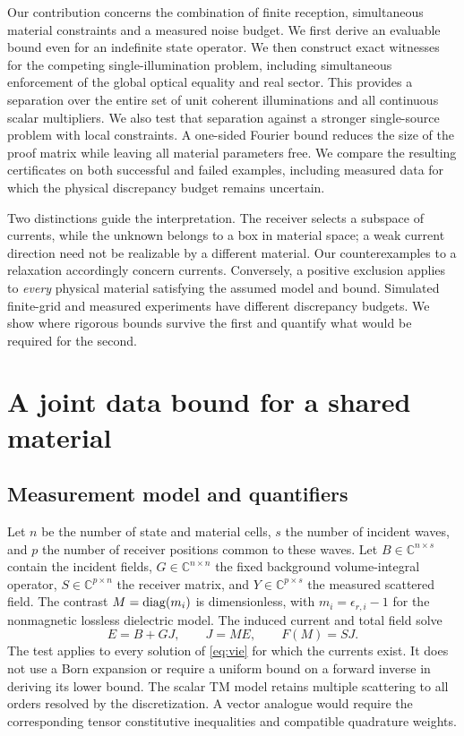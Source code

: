 \documentclass[anonymous,12pt]{iopjournal}
\theoremstyle{remark}\newtheorem{remark}[theorem]{Remark}
\newcommand{\C}{\mathbb C}\newcommand{\R}{\mathbb R}
\numberwithin{equation}{section}
\begin{document}
Our contribution concerns the combination of finite reception, simultaneous material constraints and a measured noise budget. We first derive an evaluable bound even for an indefinite state operator. We then construct exact witnesses for the competing single-illumination problem, including simultaneous enforcement of the global optical equality and real sector. This provides a separation over the entire set of unit coherent illuminations and all continuous scalar multipliers. We also test that separation against a stronger single-source problem with local constraints. A one-sided Fourier bound reduces the size of the proof matrix while leaving all material parameters free. We compare the resulting certificates on both successful and failed examples, including measured data for which the physical discrepancy budget remains uncertain.

Two distinctions guide the interpretation. The receiver selects a subspace of currents, while the unknown belongs to a box in material space; a weak current direction need not be realizable by a different material. Our counterexamples to a relaxation accordingly concern currents. Conversely, a positive exclusion applies to \emph{every} physical material satisfying the assumed model and bound. Simulated finite-grid and measured experiments have different discrepancy budgets. We show where rigorous bounds survive the first and quantify what would be required for the second.

\section{A joint data bound for a shared material}\label{sec:joint}

\subsection{Measurement model and quantifiers}
Let $n$ be the number of state and material cells, $s$ the number of incident waves, and $p$ the number of receiver positions common to these waves. Let $B\in\C^{n\times s}$ contain the incident fields, $G\in\C^{n\times n}$ the fixed background volume-integral operator, $S\in\C^{p\times n}$ the receiver matrix, and $Y\in\C^{p\times s}$ the measured scattered field. The contrast $M=\operatorname{diag}(m_i)$ is dimensionless, with $m_i=\epsilon_{r,i}-1$ for the nonmagnetic lossless dielectric model. The induced current and total field solve
\begin{equation}
 E=B+GJ,\qquad J=ME,\qquad F(M)=SJ. \label{eq:vie}
\end{equation}
The test applies to every solution of \eqref{eq:vie} for which the currents exist. It does not use a Born expansion or require a uniform bound on a forward inverse in deriving its lower bound. The scalar TM model retains multiple scattering to all orders resolved by the discretization. A vector analogue would require the corresponding tensor constitutive inequalities and compatible quadrature weights.
\end{document}
